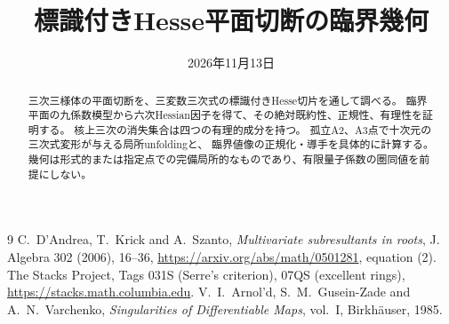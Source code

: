 \documentclass[11pt,a4paper]{ltjsarticle}
\title{標識付きHesse平面切断の臨界幾何}
\date{2026年11月13日}
\begin{document}
\maketitle
\begin{abstract}
三次三様体の平面切断を、三変数三次式の標識付きHesse切片を通して調べる。
臨界平面の九係数模型から六次Hessian因子を得て、その絶対既約性、正規性、有理性を証明する。
核上三次の消失集合は四つの有理的成分を持つ。
孤立A2、A3点で十次元の三次式変形が与える局所unfoldingと、
臨界値像の正規化・導手を具体的に計算する。
幾何は形式的または指定点での完備局所的なものであり、有限量子係数の圏同値を前提にしない。
\end{abstract}






\begin{thebibliography}{9}
 C.~D'Andrea, T.~Krick and A.~Szanto,
\emph{Multivariate subresultants in roots}, J. Algebra 302 (2006), 16--36,
\url{https://arxiv.org/abs/math/0501281}, equation (2).
 The Stacks Project, Tags 031S (Serre's criterion), 07QS (excellent rings),
\url{https://stacks.math.columbia.edu}.
 V.~I.~Arnol'd, S.~M.~Gusein-Zade and A.~N.~Varchenko,
\emph{Singularities of Differentiable Maps}, vol.~I, Birkh\"auser, 1985.
\end{thebibliography}
\end{document}
